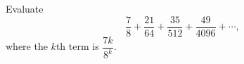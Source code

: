 Evaluate
\[
\dfrac{7}{8}+\dfrac{21}{64}+\dfrac{35}{512}+\dfrac{49}{4096}+\cdots,
\]
where the $k$th term is $\dfrac{7k}{8^k}$.
